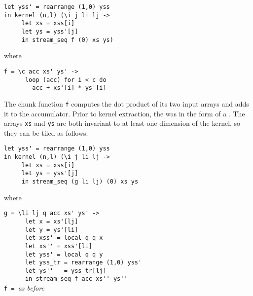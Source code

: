 \begin{lstlisting}
let yss' = rearrange (1,0) yss
in kernel (n,l) (\i j li lj ->
     let xs = xss[i]
     let ys = yss'[j]
     in stream_seq f (0) xs ys)
\end{lstlisting}
\begin{minipage}[t]{0.1\linewidth}
  \begin{flushright}
    where
  \end{flushright}
\end{minipage}
\begin{minipage}[t]{0.8\linewidth}
\lstinline{f = \c acc xs' ys' ->}\\
\lstinline{      loop (acc) for i < c do}\\
\lstinline{        acc + xs'[i] * ys'[i]}
\end{minipage}
\vspace{1em}

The chunk function \lstinline{f} computes the dot product of its two
input arrays and adds it to the accumulator.  Prior to kernel
extraction, the \StreamSeq{} was in the form of a .  The
arrays \lstinline{xs} and \lstinline{ys} are both invariant to at
least one dimension of the kernel, so they can be tiled as follows:

\begin{lstlisting}
let yss' = rearrange (1,0) yss
in kernel (n,l) (\i j li lj ->
     let xs = xss[i]
     let ys = yss'[j]
     in stream_seq (g li lj) (0) xs ys
\end{lstlisting}
\begin{minipage}[t]{0.1\linewidth}
  \begin{flushright}
    where
  \end{flushright}
\end{minipage}
\begin{minipage}[t]{0.8\linewidth}
\lstinline{g = \li lj q acc xs' ys' ->}\\
\lstinline{      let x = xs'[lj]} \\
\lstinline{      let y = ys'[li]} \\
\lstinline{      let xss' = local q q x}\\
\lstinline{      let xs'' = xss'[li]}\\
\lstinline{      let yss' = local q q y}\\
\lstinline{      let yss_tr = rearrange (1,0) yss'}\\
\lstinline{      let ys''   = yss_tr[lj]}\\
\lstinline{      in stream_seq f acc xs'' ys''}\\
\lstinline{f = }\textit{as before}
\end{minipage}
\vspace{1em}

